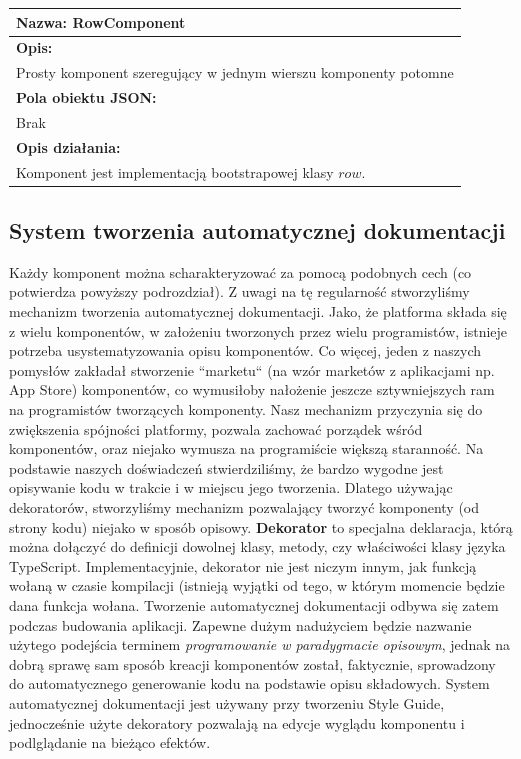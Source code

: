 \documentclass[licencjacka]{pracamgr}
\begin{document}

\begin{tabularx}{\linewidth}{|l|}\hline
\textbf{Nazwa:}
RowComponent
\\\hline
\textbf{Opis:}\\

Prosty komponent szeregujący w jednym wierszu komponenty potomne\\
\hline
\textbf{Pola obiektu JSON:} \\
Brak\\
\hline
\textbf{Opis działania:}\\
Komponent jest implementacją bootstrapowej klasy $row$.
\\\hline
\end{tabularx}

\subsection{System tworzenia automatycznej dokumentacji}
Każdy komponent można scharakteryzować za pomocą podobnych cech (co potwierdza powyższy podrozdział).
Z uwagi na tę regularność stworzyliśmy mechanizm tworzenia automatycznej dokumentacji.
Jako, że platforma składa się z wielu komponentów, w założeniu tworzonych przez wielu
programistów, istnieje potrzeba usystematyzowania opisu komponentów. Co więcej, jeden z naszych pomysłów
zakładał stworzenie ``marketu`` (na wzór marketów z aplikacjami np. App Store) komponentów, co wymusiłoby
nałożenie jeszcze sztywniejszych ram na programistów tworzących komponenty.
Nasz mechanizm przyczynia się do zwiększenia spójności platformy, pozwala zachować porządek
wśród komponentów, oraz niejako wymusza na programiście większą staranność.
Na podstawie naszych doświadczeń stwierdziliśmy, że bardzo wygodne jest opisywanie
kodu w trakcie i w miejscu jego tworzenia. Dlatego używając dekoratorów,
stworzyliśmy mechanizm pozwalający tworzyć komponenty (od strony kodu) niejako w sposób opisowy.
\textbf{Dekorator} to specjalna deklaracja, którą można dołączyć do definicji dowolnej klasy, metody, czy właściwości klasy języka TypeScript. 
Implementacyjnie, dekorator nie jest niczym innym, jak funkcją wołaną w czasie kompilacji (istnieją wyjątki od tego, w którym momencie będzie dana funkcja wołana.
Tworzenie automatycznej dokumentacji odbywa się zatem podczas budowania aplikacji.
Zapewne dużym nadużyciem będzie nazwanie użytego podejścia terminem
\textit{programowanie w paradygmacie opisowym},
jednak na dobrą sprawę sam sposób kreacji komponentów został, faktycznie, sprowadzony do
automatycznego generowanie kodu na podstawie opisu składowych.
System automatycznej dokumentacji jest używany przy tworzeniu Style Guide, jednocześnie użyte dekoratory pozwalają
na edycje wyglądu komponentu i podlglądanie na bieżąco efektów. 
\end{document}
